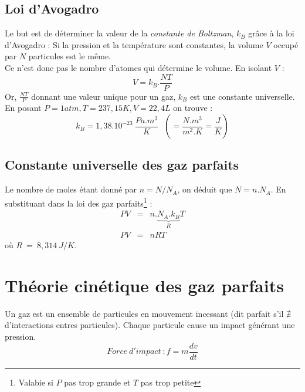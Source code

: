 \documentclass	[11pt, a4paper, openany]{book}
\begin{document}
\subsection{Loi d'Avogadro}
Le but est de déterminer la valeur de la \textit{constante de Boltzman}, $k_B$ grâce à la loi d'Avogadro : Si la pression et la température sont constantes, la volume $V$ occupé par $N$ particules est le même.\\ Ce n'est donc pas le nombre d'atomes qui détermine le volume. En isolant $V$ :
\begin{equation}
	V = k_B . \frac{NT}{P}
\end{equation}
Or, $\frac{NT}{P}$ donnant une valeur unique pour un gaz, $k_B$ est une constante universelle. \\En posant $P=1atm, T = 237,15K, V = 22,4 L$ on trouve :
\begin{equation}
	k_B = 1,38.10^{-23}\ \frac{Pa.m^3}{K}\ \ \  \left(= \frac{N.m^3}{m^2.K} = \frac{J}{K}\right)
\end{equation}

\subsection{Constante universelle des gaz parfaits}
Le nombre de moles étant donné par $n = N/N_A$, on déduit que $N = n.N_A$. En substituant dans la loi des gaz parfaits\footnote{Valabie si $P$ pas trop grande et $T$ pas trop petite} :
\begin{eqnarray}
	PV &=& n.\underbrace{N_A.k_B}_R T\\
	PV &=& nRT
\end{eqnarray}
où $R\ =\ 8,314\ J/K$.

\section{Théorie cinétique des gaz parfaits}
Un gaz est un ensemble de particules en mouvement incessant (dit parfait s'il $\nexists$ d'interactions entres particules). Chaque particule cause un impact générant une pression.
\begin{equation}
	Force\ d'impact\ : f = m\frac{dv}{dt}
\end{equation}
\end{document}
